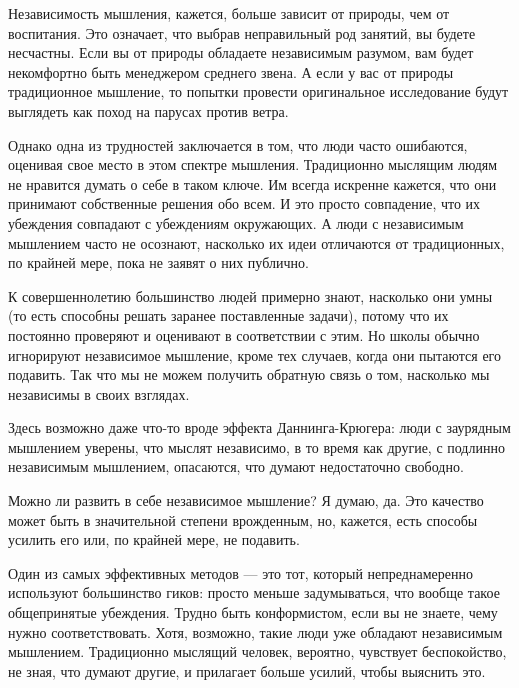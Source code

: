 \documentclass[ebook,12pt,oneside,openany]{memoir}
\begin{document}
Независимость мышления, кажется, больше зависит от природы, чем от
воспитания. Это означает, что выбрав неправильный род занятий, вы
будете несчастны. Если вы от природы обладаете независимым разумом,
вам будет некомфортно быть менеджером среднего звена. А если у вас от
природы традиционное мышление, то попытки провести оригинальное
исследование будут выглядеть как поход на парусах против ветра. \newline

Однако одна из трудностей заключается в том, что люди часто ошибаются,
оценивая свое место в этом спектре мышления. Традиционно мыслящим
людям не нравится думать о себе в таком ключе. Им всегда искренне
кажется, что они принимают собственные решения обо всем. И это просто
совпадение, что их убеждения совпадают с убеждениям окружающих. А люди
с независимым мышлением часто не осознают, насколько их идеи
отличаются от традиционных, по крайней мере, пока не заявят о них
публично. \newline

К совершеннолетию большинство людей примерно знают, насколько они умны
(то есть способны решать заранее поставленные задачи), потому что их
постоянно проверяют и оценивают в соответствии с этим. Но школы обычно
игнорируют независимое мышление, кроме тех случаев, когда они пытаются
его подавить. Так что мы не можем получить обратную связь о том,
насколько мы независимы в своих взглядах. \newline

Здесь возможно даже что-то вроде эффекта Даннинга-Крюгера: люди с
заурядным мышлением уверены, что мыслят независимо, в то время как
другие, с подлинно независимым мышлением, опасаются, что думают
недостаточно свободно. \newline

Можно ли развить в себе независимое мышление? Я думаю, да. Это
качество может быть в значительной степени врожденным, но, кажется,
есть способы усилить его или, по крайней мере, не подавить. \newline

Один из самых эффективных методов — это тот, который непреднамеренно
используют большинство гиков: просто меньше задумываться, что вообще
такое общепринятые убеждения. Трудно быть конформистом, если вы не
знаете, чему нужно соответствовать. Хотя, возможно, такие люди уже
обладают независимым мышлением. Традиционно мыслящий человек,
вероятно, чувствует беспокойство, не зная, что думают другие, и
прилагает больше усилий, чтобы выяснить это. \newline
\end{document}
